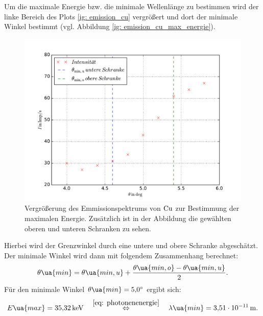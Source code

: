 Um die maximale Energie bzw. die minimale Wellenlänge zu bestimmen wird der linke
Bereich des Plots \ref{ig: emission_cu} vergrößert und dort der minimale Winkel bestimmt (vgl. Abbildung \ref{ig: emission_cu_max_energie}).
\begin{figure}
  \centering
  \includegraphics[width=1 \textwidth]{../Messdaten/emission_cu_maximale_energies.pdf}
  \caption{Vergrößerung des Emmissionspektrums von $\ce{Cu}$ zur Bestimmung der maximalen Energie. Zusätzlich ist in der Abbildung die gewählten oberen und unteren Schranken zu sehen.}
  \label{fig: emission_cu_max_energie}
\end{figure}
Hierbei wird der Grenzwinkel durch eine untere und obere Schranke abgeschätzt.
Der minimale Winkel wird dann mit folgendem Zusammenhang berechnet:
\begin{equation*}
  \theta\ua{min}=\theta\ua{min,u}+\frac{\theta\ua{min,o}-\theta\ua{min,u}}{2}.
\end{equation*}
Für den minimale Winkel $\theta\ua{min}=\SI{5.0}{\degree}$ ergibt sich:
\begin{equation}
  \label{eq: maximale_energie}
  E\ua{max}=\SI{35.32}{\kilo\eV} \quad \overset{\eqref{eq: photonenenergie}}{\Leftrightarrow} \quad \lambda\ua{min}=\SI{3.51e-11}{\meter}.
\end{equation}

